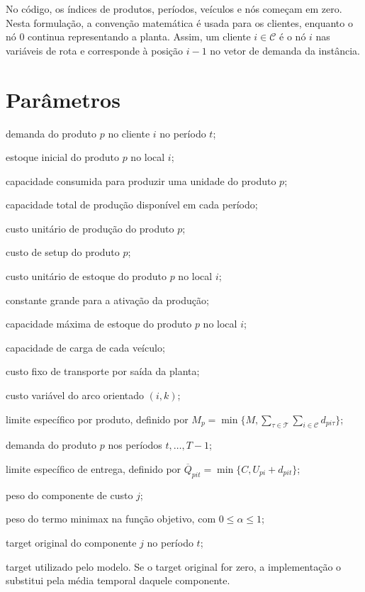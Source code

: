 \documentclass[11pt,a4paper]{article}
\newcommand{\set}[1]{\mathcal{#1}}
\begin{document}
No código, os índices de produtos, períodos, veículos e nós começam em zero.
Nesta formulação, a convenção matemática é usada para os clientes, enquanto o
nó $0$ continua representando a planta. Assim, um cliente $i\in\set{C}$ é o
nó $i$ nas variáveis de rota e corresponde à posição $i-1$ no vetor de demanda
da instância.

\section{Parâmetros}

\begin{description}[leftmargin=3.2cm,style=nextline]
  \item[$d_{pit}$] demanda do produto $p$ no cliente $i$ no período $t$;
  \item[$I^0_{pi}$] estoque inicial do produto $p$ no local $i$;
  \item[$b_p$] capacidade consumida para produzir uma unidade do produto $p$;
  \item[$B$] capacidade total de produção disponível em cada período;
  \item[$c_p$] custo unitário de produção do produto $p$;
  \item[$s_p$] custo de setup do produto $p$;
  \item[$h_{pi}$] custo unitário de estoque do produto $p$ no local $i$;
  \item[$M$] constante grande para a ativação da produção;
  \item[$U_{pi}$] capacidade máxima de estoque do produto $p$ no local $i$;
  \item[$C$] capacidade de carga de cada veículo;
  \item[$f$] custo fixo de transporte por saída da planta;
  \item[$a_{ik}$] custo variável do arco orientado $(i,k)$;
  \item[$M_p$] limite específico por produto, definido por
  $M_p=\min\{M,\sum_{\tau\in\set{T}}\sum_{i\in\set{C}}d_{pi\tau}\}$;
  \item[$D^{\mathrm{restante}}_{p,t}$] demanda do produto $p$ nos períodos
  $t,\ldots,T-1$;
  \item[$\overline Q_{pit}$] limite específico de entrega, definido por
  $\overline Q_{pit}=\min\{C,U_{pi}+d_{pit}\}$;
  \item[$w_j$] peso do componente de custo $j$;
  \item[$\alpha$] peso do termo minimax na função objetivo, com
  $0\le\alpha\le1$;
  \item[$b_t^j$] target original do componente $j$ no período $t$;
  \item[$\widetilde b_t^j$] target utilizado pelo modelo. Se o target original
  for zero, a implementação o substitui pela média temporal daquele componente.
\end{description}
\end{document}
